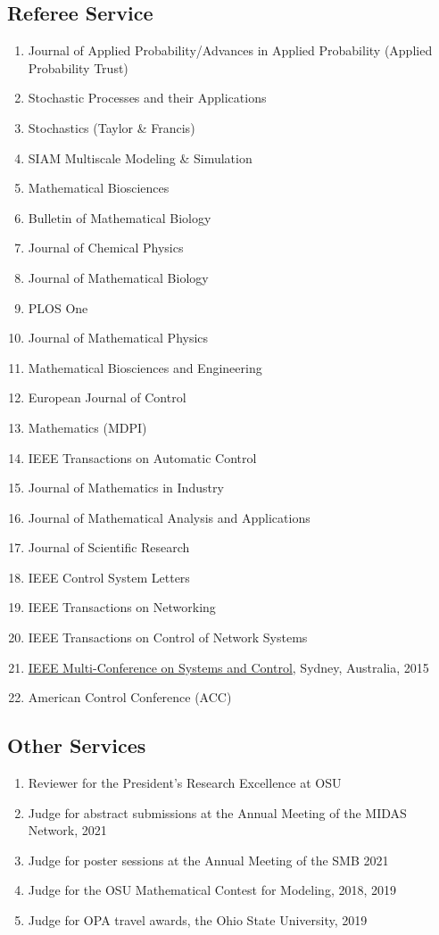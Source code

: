 \documentclass[11pt,a4paper,sans]{moderncv}        %
\begin{document}
\subsection{Referee Service}
\begin{enumerate}
	\item {Journal of Applied Probability/Advances in Applied Probability (Applied Probability Trust)}
	\item {Stochastic Processes and their Applications}
	\item Stochastics (Taylor \& Francis)
	\item SIAM Multiscale Modeling \& Simulation
	\item Mathematical Biosciences
	\item {Bulletin of Mathematical Biology}
	\item {Journal of Chemical Physics}
    \item {Journal of Mathematical Biology}
    \item {PLOS One}
    \item Journal of Mathematical Physics
    \item Mathematical Biosciences and Engineering
    \item European Journal of Control 
    \item {Mathematics (MDPI)}
	\item {IEEE Transactions on Automatic Control}
	\item Journal of Mathematics in Industry 
	\item Journal of Mathematical Analysis and Applications
	\item Journal of Scientific Research  
	\item IEEE Control System Letters
	\item {IEEE Transactions on Networking}
    \item {IEEE Transactions on Control of Network Systems}
	\item {\href{http://msc2015.ieeecss.org/}{IEEE Multi-Conference on Systems and Control}, Sydney, Australia, 2015}
	\item American Control Conference (ACC)
\end{enumerate}


\subsection{Other Services}
\begin{enumerate}
	\item Reviewer for the President’s Research Excellence at OSU
	\item Judge for abstract submissions at the Annual Meeting of the MIDAS Network, 2021
	\item Judge for poster sessions at the Annual Meeting of the SMB 2021
	\item{Judge for the OSU Mathematical Contest for Modeling, 2018, 2019}
	\item {Judge for OPA travel awards, the Ohio State University, 2019}
\end{enumerate}
\end{document}
